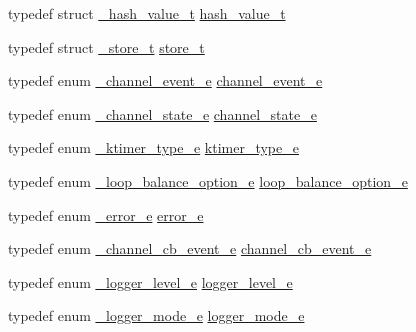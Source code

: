 \begin{DoxyCompactItemize}
\item 
typedef struct \hyperlink{a00010}{\+\_\+hash\+\_\+value\+\_\+t} \hyperlink{a00044_af7ecd66aeef0ce1b0495e5f65e77733e_af7ecd66aeef0ce1b0495e5f65e77733e}{hash\+\_\+value\+\_\+t}
\item 
typedef struct \hyperlink{a00027}{\+\_\+store\+\_\+t} \hyperlink{a00044_ac5e23aa8669eede04d771010dbd201b4_ac5e23aa8669eede04d771010dbd201b4}{store\+\_\+t}
\item 
typedef enum \hyperlink{a00044_a1460362ccf3a6ba930a1a3ac2f73f3ea_a1460362ccf3a6ba930a1a3ac2f73f3ea}{\+\_\+channel\+\_\+event\+\_\+e} \hyperlink{a00044_a5ad43ab162fdf9ad53cde10ed3d87d99_a5ad43ab162fdf9ad53cde10ed3d87d99}{channel\+\_\+event\+\_\+e}
\item 
typedef enum \hyperlink{a00044_a18bbc160902cdba0f52f5a3cd879b47f_a18bbc160902cdba0f52f5a3cd879b47f}{\+\_\+channel\+\_\+state\+\_\+e} \hyperlink{a00044_a1956eea3012f780b5d592a9d09d9873c_a1956eea3012f780b5d592a9d09d9873c}{channel\+\_\+state\+\_\+e}
\item 
typedef enum \hyperlink{a00044_a7945681f6589a5f4f6cf55f4f4092d28_a7945681f6589a5f4f6cf55f4f4092d28}{\+\_\+ktimer\+\_\+type\+\_\+e} \hyperlink{a00044_a42e924130e6eb3bd995344f6d3f3e918_a42e924130e6eb3bd995344f6d3f3e918}{ktimer\+\_\+type\+\_\+e}
\item 
typedef enum \hyperlink{a00044_a0f82b35b603ffed92ea1a74205f10781_a0f82b35b603ffed92ea1a74205f10781}{\+\_\+loop\+\_\+balance\+\_\+option\+\_\+e} \hyperlink{a00044_a6c87150c8f33855c3427c783480fd8ba_a6c87150c8f33855c3427c783480fd8ba}{loop\+\_\+balance\+\_\+option\+\_\+e}
\item 
typedef enum \hyperlink{a00044_ad8bc998d415be9115a064a8307df0ed5_ad8bc998d415be9115a064a8307df0ed5}{\+\_\+error\+\_\+e} \hyperlink{a00044_a884b5eeef8214526df297659611c7d9b_a884b5eeef8214526df297659611c7d9b}{error\+\_\+e}
\item 
typedef enum \hyperlink{a00044_a2217ac7363dbae279d056a361d122915_a2217ac7363dbae279d056a361d122915}{\+\_\+channel\+\_\+cb\+\_\+event\+\_\+e} \hyperlink{a00044_aaf2cba5d4035f3d56350b59342ebf65c_aaf2cba5d4035f3d56350b59342ebf65c}{channel\+\_\+cb\+\_\+event\+\_\+e}
\item 
typedef enum \hyperlink{a00044_a4e764c733cf98ee587ca17412fca9148_a4e764c733cf98ee587ca17412fca9148}{\+\_\+logger\+\_\+level\+\_\+e} \hyperlink{a00044_afe883c56a5fd8d7794a3dd36780ed9d0_afe883c56a5fd8d7794a3dd36780ed9d0}{logger\+\_\+level\+\_\+e}
\item 
typedef enum \hyperlink{a00044_a95d677e6aef6e1699b92848e4497c23a_a95d677e6aef6e1699b92848e4497c23a}{\+\_\+logger\+\_\+mode\+\_\+e} \hyperlink{a00044_aa72cd8c306f50bee7c64e1daa1c1f3f4_aa72cd8c306f50bee7c64e1daa1c1f3f4}{logger\+\_\+mode\+\_\+e}

\end{DoxyCompactItemize}
